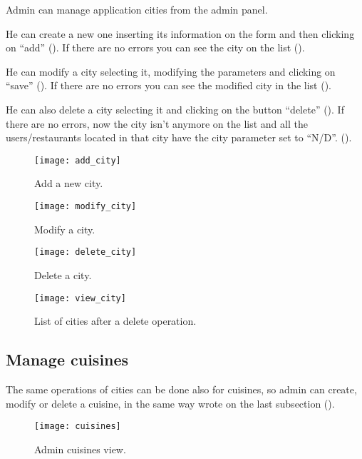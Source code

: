 Admin can manage application cities from the admin panel.

He can create a new one inserting its information on the form and then clicking
on ``add'' (). If there are no errors you can see the city
on the list ().

He can modify a city selecting it, modifying the parameters and clicking on
``save'' (). If there are no errors you can see the
modified city in the list ().

He can also delete a city selecting it and clicking on the button ``delete''
(). If there are no errors, now the city isn't anymore
on the list and all the users/restaurants located in that city have the city
parameter set to ``N/D''. ().

\begin{figure}[H]
	\texttt{[image: add\_city]}
	\caption{Add a new city.}\label{fig:add_city}
\end{figure}

\begin{figure}[H]
	\texttt{[image: modify\_city]}
	\caption{Modify a city.}\label{fig:modify_city}
\end{figure}

\begin{figure}[H]
	\texttt{[image: delete\_city]}
	\caption{Delete a city.}\label{fig:delete_city}
\end{figure}

\begin{figure}[H]
	\texttt{[image: view\_city]}
	\caption{List of cities after a delete operation.}\label{fig:view_city}
\end{figure}

\subsection{Manage cuisines}

The same operations of cities can be done also for cuisines, so admin can
create, modify or delete a cuisine, in the same way wrote on the last subsection
().

\begin{figure}[H]
	\texttt{[image: cuisines]}
	\caption{Admin cuisines view.}\label{fig:cuisines}
\end{figure}
